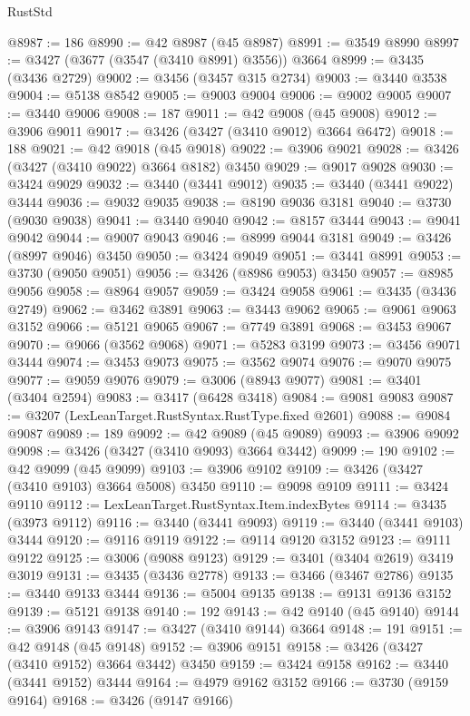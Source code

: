 \begin{lexlean}{RustStd}
\begin{coremodule}
@8987 := 186
@8990 := @42 @8987 (@45 @8987)
@8991 := @3549 @8990
@8997 := @3427 (@3677 (@3547 (@3410 @8991) @3556)) @3664
@8999 := @3435 (@3436 @2729)
@9002 := @3456 (@3457 @315 @2734)
@9003 := @3440 @3538
@9004 := @5138 @8542
@9005 := @9003 @9004
@9006 := @9002 @9005
@9007 := @3440 @9006
@9008 := 187
@9011 := @42 @9008 (@45 @9008)
@9012 := @3906 @9011
@9017 := @3426 (@3427 (@3410 @9012) @3664 @6472)
@9018 := 188
@9021 := @42 @9018 (@45 @9018)
@9022 := @3906 @9021
@9028 := @3426 (@3427 (@3410 @9022) @3664 @8182) @3450
@9029 := @9017 @9028
@9030 := @3424 @9029
@9032 := @3440 (@3441 @9012)
@9035 := @3440 (@3441 @9022) @3444
@9036 := @9032 @9035
@9038 := @8190 @9036 @3181
@9040 := @3730 (@9030 @9038)
@9041 := @3440 @9040
@9042 := @8157 @3444
@9043 := @9041 @9042
@9044 := @9007 @9043
@9046 := @8999 @9044 @3181
@9049 := @3426 (@8997 @9046) @3450
@9050 := @3424 @9049
@9051 := @3441 @8991
@9053 := @3730 (@9050 @9051)
@9056 := @3426 (@8986 @9053) @3450
@9057 := @8985 @9056
@9058 := @8964 @9057
@9059 := @3424 @9058
@9061 := @3435 (@3436 @2749)
@9062 := @3462 @3891
@9063 := @3443 @9062
@9065 := @9061 @9063 @3152
@9066 := @5121 @9065
@9067 := @7749 @3891
@9068 := @3453 @9067
@9070 := @9066 (@3562 @9068)
@9071 := @5283 @3199
@9073 := @3456 @9071 @3444
@9074 := @3453 @9073
@9075 := @3562 @9074
@9076 := @9070 @9075
@9077 := @9059 @9076
@9079 := @3006 (@8943 @9077)
@9081 := @3401 (@3404 @2594)
@9083 := @3417 (@6428 @3418)
@9084 := @9081 @9083
@9087 := @3207 (LexLeanTarget.RustSyntax.RustType.fixed @2601)
@9088 := @9084 @9087
@9089 := 189
@9092 := @42 @9089 (@45 @9089)
@9093 := @3906 @9092
@9098 := @3426 (@3427 (@3410 @9093) @3664 @3442)
@9099 := 190
@9102 := @42 @9099 (@45 @9099)
@9103 := @3906 @9102
@9109 := @3426 (@3427 (@3410 @9103) @3664 @5008) @3450
@9110 := @9098 @9109
@9111 := @3424 @9110
@9112 := LexLeanTarget.RustSyntax.Item.indexBytes
@9114 := @3435 (@3973 @9112)
@9116 := @3440 (@3441 @9093)
@9119 := @3440 (@3441 @9103) @3444
@9120 := @9116 @9119
@9122 := @9114 @9120 @3152
@9123 := @9111 @9122
@9125 := @3006 (@9088 @9123)
@9129 := @3401 (@3404 @2619) @3419 @3019
@9131 := @3435 (@3436 @2778)
@9133 := @3466 (@3467 @2786)
@9135 := @3440 @9133 @3444
@9136 := @5004 @9135
@9138 := @9131 @9136 @3152
@9139 := @5121 @9138
@9140 := 192
@9143 := @42 @9140 (@45 @9140)
@9144 := @3906 @9143
@9147 := @3427 (@3410 @9144) @3664
@9148 := 191
@9151 := @42 @9148 (@45 @9148)
@9152 := @3906 @9151
@9158 := @3426 (@3427 (@3410 @9152) @3664 @3442) @3450
@9159 := @3424 @9158
@9162 := @3440 (@3441 @9152) @3444
@9164 := @4979 @9162 @3152
@9166 := @3730 (@9159 @9164)
@9168 := @3426 (@9147 @9166)

\end{coremodule}
\end{lexlean}
